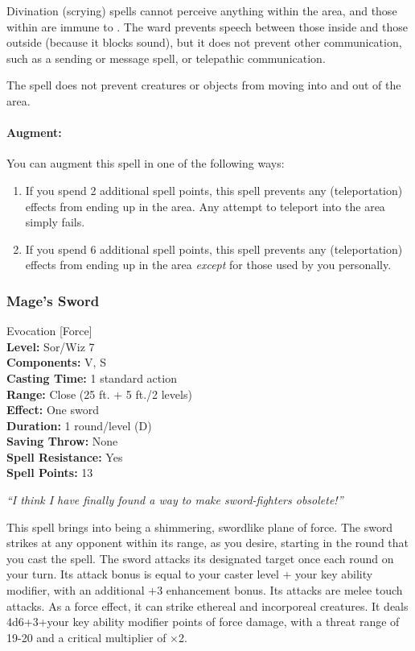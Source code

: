 Divination (scrying) spells cannot perceive anything within the area, 
and those within are immune to . 
The ward prevents speech between those inside and those outside (because it blocks sound), 
but it does not prevent other communication, such as a sending or message spell, 
or telepathic communication.%

The spell does not prevent creatures or objects from moving into and out of the area.

\paragraph{Augment:} You can augment this spell in one of the following ways:
\begin{enumerate}
 \item If you spend 2 additional spell points, this spell prevents any (teleportation)
effects from ending up in the area. Any attempt to teleport into the area simply fails.
 \item If you spend 6 additional spell points, this spell prevents any (teleportation)
effects from ending up in the area \emph{except} for those used by you personally.
\end{enumerate}

\subsubsection{Mage's Sword}
\label{Spell:MagesSword}
Evocation [Force]
\\ \textbf{Level:} Sor/Wiz 7
\\ \textbf{Components:} V, S
\\ \textbf{Casting Time:} 1 standard action
\\ \textbf{Range:} Close (25 ft. + 5 ft./2 levels)
\\ \textbf{Effect:} One sword
\\ \textbf{Duration:} 1 round/level (D)
\\ \textbf{Saving Throw:} None
\\ \textbf{Spell Resistance:} Yes
\\ \textbf{Spell Points:} 13

\emph{``I think I have finally found a way to make sword-fighters obsolete!''}

This spell brings into being a shimmering, swordlike plane of force. 
The sword strikes at any opponent within its range, as you desire, starting in the round that you cast the spell. 
The sword attacks its designated target once each round on your turn. 
Its attack bonus is equal to your caster level + your key ability modifier, with an additional +3 enhancement bonus.
Its attacks are melee touch attacks.
As a force effect, it can strike ethereal and incorporeal creatures. 
It deals 4d6+3+your key ability modifier points of force damage, with a threat range of 19-20 and a critical multiplier of $\times$2.

